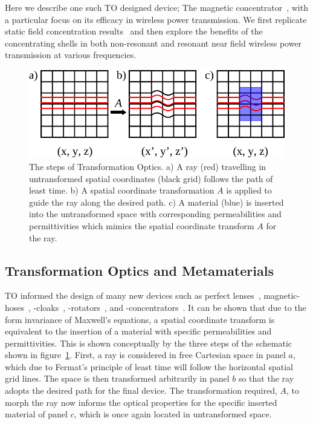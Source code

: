 \documentclass[11pt]{iopart}
\begin{document}
Here we describe one such TO designed device; The magnetic
concentrator~\cite{Navau2012}, with a particular focus on its efficacy
in wireless power transmission. We first replicate static field
concentration results~\cite{N2014} and then explore the benefits of
the concentrating shells in both non-resonant and resonant near field
wireless power transmission at various frequencies.

\begin{figure}
  \begin{center}
   \noindent\includegraphics[width=0.65\linewidth]{images/trans_Opt_edit.pdf}
  \end{center}
  \caption{The steps of Transformation Optics. a) A ray (red)
    travelling in untransformed spatial coordinates (black grid)
    follows the path of least time. b) A spatial coordinate
    transformation $A$ is applied to guide the ray along the desired
    path. c) A material (blue) is inserted into the untransformed
    space with corresponding permeabilities and permittivities which mimics
    the spatial coordinate transform $A$ for the ray. }
  \label{fig:TO}
\end{figure}

\subsection{Transformation Optics and Metamaterials}
TO informed the design of many new devices such as perfect
lenses~\cite{Pendry2000}, magnetic-hoses~\cite{Navau2014}, -cloaks~\cite{Sun2017},
-rotators~\cite{Sun2017}, and -concentrators~\cite{Navau2012}. It
can be shown that due to the form invariance of Maxwell's equations, a
spatial coordinate transform is equivalent to the insertion of a
material with specific permeabilities and permittivities. This is shown
conceptually by the three steps of the schematic shown in
figure~\ref{fig:TO}. First, a ray is considered in free Cartesian space
in panel $a$, which due to Fermat's principle of least time will 
follow the horizontal spatial grid lines.  The space is then
transformed arbitrarily in panel $b$ so that the ray adopts the
desired path for the final device. The transformation required, $A$,
to morph the ray now informs the optical properties for the specific
inserted material of panel $c$, which is once again located in
untransformed space.
\end{document}
